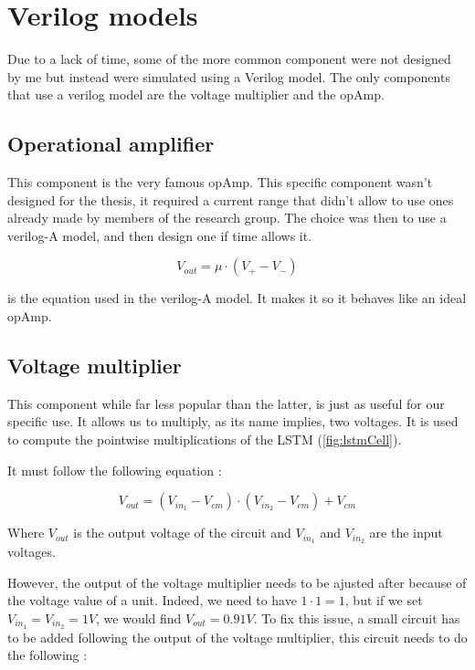 \section{Verilog models}
\label{sec:models}

Due to a lack of time, some of the more common component were not designed by me but instead were simulated using a Verilog model. The only components that use a verilog model are the voltage multiplier and the \ac{opAmp}.

\subsection{Operational amplifier}

This component is the very famous \ac{opAmp}. This specific component wasn't designed for the thesis, it required a current range that didn't allow to use ones already made by members of the research group. The choice was then to use a verilog-A model, and then design one if time allows it.

\begin{equation}
  \label{eq:opAmp}
  V_{out}=\mu \cdot (V_+-V_-)
\end{equation}

 is the equation used in the verilog-A model. It makes it so it behaves like an ideal \ac{opAmp}.

\subsection{Voltage multiplier}

This component while far less popular than the latter, is just as useful for our specific use. It allows us to multiply, as its name implies, two voltages. It is used to compute the pointwise multiplications of the \ac{LSTM} (\cref{fig:lstmCell}).

It must follow the following equation :

\begin{equation}
  V_{out}=(V_{in_1}-V_{cm})\cdot (V_{in_2}-V_{cm}) + V_{cm}
\end{equation}

Where $V_{out}$ is the output voltage of the circuit and $V_{in_1}$ and $V_{in_2}$ are the input voltages.

However, the output of the voltage multiplier needs to be ajusted after because of the voltage value of a unit. Indeed, we need to have $1\cdot 1=1$, but if we set $V_{in_1}=V_{in_2}=1V$, we would find $V_{out}=0.91V$. To fix this issue, a small circuit has to be added following the output of the voltage multiplier, this circuit needs to do the following :

